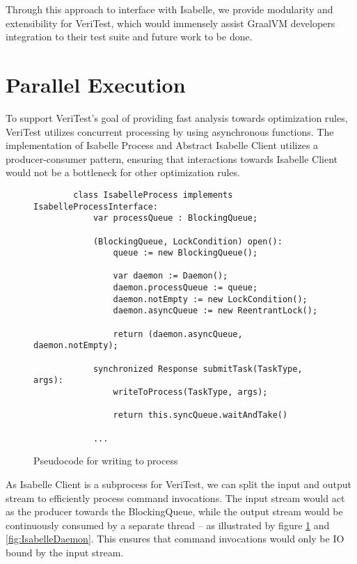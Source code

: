 Through this approach to interface with Isabelle, we provide modularity and extensibility for VeriTest, which would immensely assist 
GraalVM developers integration to their test suite and future work to be done.

\section{Parallel Execution}
\label{sec:ParallelExecution}

To support VeriTest's goal of providing fast analysis towards optimization rules, VeriTest utilizes concurrent processing by using asynchronous 
functions. The implementation of Isabelle Process and Abstract Isabelle Client utilizes a producer-consumer pattern, ensuring 
that interactions towards Isabelle Client would not be a bottleneck for other optimization rules.

\begin{figure}[h]
    \begin{lstlisting}
        class IsabelleProcess implements IsabelleProcessInterface:
            var processQueue : BlockingQueue;

            (BlockingQueue, LockCondition) open():
                queue := new BlockingQueue();

                var daemon := Daemon();
                daemon.processQueue := queue;
                daemon.notEmpty := new LockCondition();
                daemon.asyncQueue := new ReentrantLock();

                return (daemon.asyncQueue, daemon.notEmpty);
            
            synchronized Response submitTask(TaskType, args):
                writeToProcess(TaskType, args);
                
                return this.syncQueue.waitAndTake()
            
            ...
    \end{lstlisting}

    \caption{Pseudocode for writing to process}
    \label{fig:IsabelleProcess}
\end{figure}

As Isabelle Client is a subprocess for VeriTest, we can split the input and output stream to efficiently process command invocations. 
The input stream would act as the producer towards the BlockingQueue, while the output stream would be continuously consumed by a separate 
thread -- as illustrated by figure \ref{fig:IsabelleProcess} and \ref{fig:IsabelleDaemon}. This ensures that command invocations would only be 
IO bound by the input stream.

